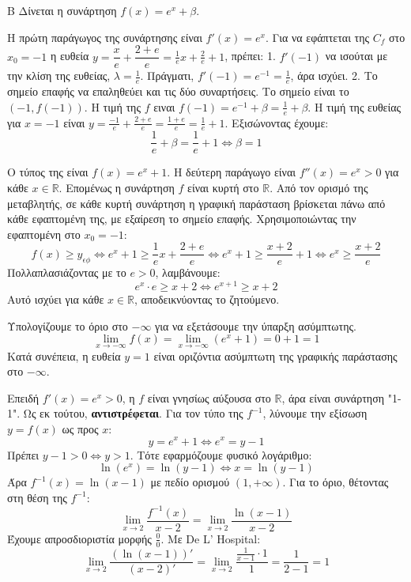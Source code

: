 \begin{thema}{Β}
Δίνεται η συνάρτηση $f(x) = e^x + \beta$.
\begin{erwthma}
\item Η πρώτη παράγωγος της συνάρτησης είναι $f'(x) = e^x$.
Για να εφάπτεται της $C_f$ στο $x_0 = -1$ η ευθεία $y = \dfrac{x}{e} + \dfrac{2+e}{e} = \frac{1}{e}x + \frac{2}{e} + 1$, πρέπει:
1. $f'(-1)$ να ισούται με την κλίση της ευθείας, $\lambda = \frac{1}{e}$. Πράγματι, $f'(-1) = e^{-1} = \frac{1}{e}$, άρα ισχύει.
2. Το σημείο επαφής να επαληθεύει και τις δύο συναρτήσεις. Το σημείο είναι το $(-1, f(-1))$.
Η τιμή της $f$ ειναι $f(-1) = e^{-1} + \beta = \frac{1}{e} + \beta$.
Η τιμή της ευθείας για $x = -1$ είναι $y = \frac{-1}{e} + \frac{2+e}{e} = \frac{1+e}{e} = \frac{1}{e} + 1$.
Εξισώνοντας έχουμε:
\[ \frac{1}{e} + \beta = \frac{1}{e} + 1 \Leftrightarrow \beta = 1 \]

\item Ο τύπος της είναι $f(x) = e^x + 1$. Η δεύτερη παράγωγο είναι $f''(x) = e^x > 0$ για κάθε $x \in \mathbb{R}$. 
Επομένως η συνάρτηση $f$ είναι κυρτή στο $\mathbb{R}$.
Από τον ορισμό της μεταβλητής, σε κάθε κυρτή συνάρτηση η γραφική παράσταση βρίσκεται πάνω από κάθε εφαπτομένη της, με εξαίρεση το σημείο επαφής. 
Χρησιμοποιώντας την εφαπτομένη στο $x_0=-1$:
\[ f(x) \ge y_{\epsilon\phi} \Leftrightarrow e^x + 1 \ge \frac{1}{e}x + \frac{2+e}{e} \Leftrightarrow e^x + 1 \ge \frac{x+2}{e} + 1 \Leftrightarrow e^x \ge \frac{x+2}{e} \]
Πολλαπλασιάζοντας με το $e > 0$, λαμβάνουμε:
\[ e^x \cdot e \ge x + 2 \Leftrightarrow e^{x+1} \ge x+2 \]
Αυτό ισχύει για κάθε $x \in \mathbb{R}$, αποδεικνύοντας το ζητούμενο.

\item Υπολογίζουμε το όριο στο $-\infty$ για να εξετάσουμε την ύπαρξη ασύμπτωτης.
\[ \lim_{x\to-\infty} f(x) = \lim_{x\to-\infty} (e^x + 1) = 0 + 1 = 1 \]
Κατά συνέπεια, η ευθεία $y = 1$ είναι οριζόντια ασύμπτωτη της γραφικής παράστασης στο $-\infty$.

\item Επειδή $f'(x) = e^x > 0$, η $f$ είναι γνησίως αύξουσα στο $\mathbb{R}$, άρα είναι συνάρτηση "1-1". Ως εκ τούτου, \textbf{αντιστρέφεται}.
Για τον τύπο της $f^{-1}$, λύνουμε την εξίσωση $y = f(x)$ ως προς $x$:
\[ y = e^x + 1 \Leftrightarrow e^x = y - 1 \]
Πρέπει $y - 1 > 0 \Leftrightarrow y > 1$. Τότε εφαρμόζουμε φυσικό λογάριθμο:
\[ \ln(e^x) = \ln(y-1) \Leftrightarrow x = \ln(y-1) \]
Άρα $f^{-1}(x) = \ln(x-1)$ με πεδίο ορισμού $(1, +\infty)$.
Για το όριο, θέτοντας στη θέση της $f^{-1}$:
\[ \lim_{x\to2} \frac{f^{-1}(x)}{x-2} = \lim_{x\to2} \frac{\ln(x-1)}{x-2} \]
Έχουμε απροσδιοριστία μορφής $\frac{0}{0}$. Με De L' Hospital:
\[ \lim_{x\to2} \frac{(\ln(x-1))'}{(x-2)'} = \lim_{x\to2} \frac{\frac{1}{x-1}\cdot 1}{1} = \frac{1}{2-1} = 1 \]
\end{erwthma}
\end{thema}

